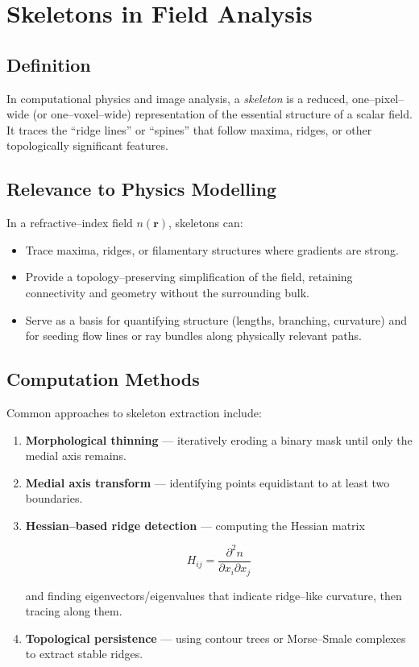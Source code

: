\documentclass{article}
\begin{document}
\section*{Skeletons in Field Analysis}

\subsection*{Definition}
In computational physics and image analysis, a \emph{skeleton} is a reduced, one--pixel--wide (or one--voxel--wide) representation of the essential structure of a scalar field. It traces the ``ridge lines'' or ``spines'' that follow maxima, ridges, or other topologically significant features.

\subsection*{Relevance to Physics Modelling}
In a refractive--index field $n(\mathbf{r})$, skeletons can:
\begin{itemize}
    \item Trace maxima, ridges, or filamentary structures where gradients are strong.
    \item Provide a topology--preserving simplification of the field, retaining connectivity and geometry without the surrounding bulk.
    \item Serve as a basis for quantifying structure (lengths, branching, curvature) and for seeding flow lines or ray bundles along physically relevant paths.
\end{itemize}

\subsection*{Computation Methods}
Common approaches to skeleton extraction include:
\begin{enumerate}
    \item \textbf{Morphological thinning} --- iteratively eroding a binary mask until only the medial axis remains.
    \item \textbf{Medial axis transform} --- identifying points equidistant to at least two boundaries.
    \item \textbf{Hessian--based ridge detection} --- computing the Hessian matrix
    
\[
    H_{ij} = \frac{\partial^2 n}{\partial x_i \partial x_j}
\]

    and finding eigenvectors/eigenvalues that indicate ridge--like curvature, then tracing along them.
    \item \textbf{Topological persistence} --- using contour trees or Morse--Smale complexes to extract stable ridges.
\end{enumerate}
\end{document}
